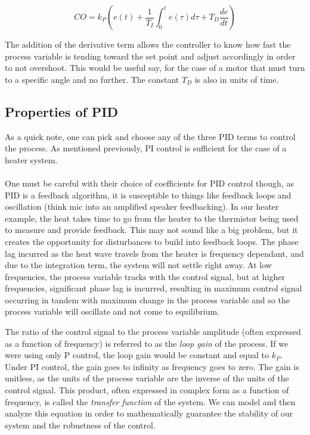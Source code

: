 \documentclass[11pt, letterpaper]{article}
\begin{document}
$$ CO =  k_P \left( e(t) + \frac{1}{T_I} \int_0^t e(\tau) d\tau + T_D \frac{de}{dt} \right)$$

The addition of the derivative term allows the controller to know how fast the process variable is tending toward the set point and adjust accordingly in order to not overshoot. This would be useful say, for the case of a motor that must turn to a specific angle and no further. The constant $T_D$ is also in units of time. 

\subsection{Properties of PID}
As a quick note, one can pick and choose any of the three PID terms to control the process. As mentioned previously, PI control is sufficient for the case of a heater system. 
\\ \\
One must be careful with their choice of coefficients for PID control though, as PID is a feedback algorithm, it is susceptible to things like feedback loops and oscillation (think mic into an amplified speaker feedbacking). In our heater example, the heat takes time to go from the heater to the thermistor being used to measure and provide feedback. This may not sound like a big problem, but it creates the opportunity for disturbances to build into feedback loops. The phase lag incurred as the heat wave travels from the heater is frequency dependant, and due to the integration term, the system will not settle right away. At low frequencies, the process variable tracks with the control signal, but at higher frequencies, significant phase lag is incurred, resulting in maximum control signal occurring in tandem with maximum change in the process variable and so the process variable will oscillate and not come to equilibrium.

The ratio of the control signal to the process variable amplitude (often expressed as a function of frequency) is referred to as the {\it loop gain} of the process. If we were using only P control, the loop gain would be constant and equal to $k_P$. Under PI control, the gain goes to infinity as frequency goes to zero. The gain is unitless, as the units of the process variable are the inverse of the units of the control signal. This product, often expressed in complex form as a function of frequency, is called the {\it transfer function} of the system. We can model and then analyze this equation in order to mathematically guarantee the stability of our system and the robustness of the control.
\end{document}

